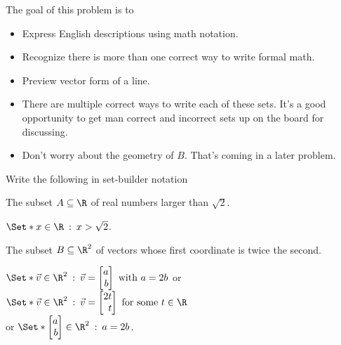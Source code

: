 \documentclass{problemset}
\newcommand{\bookonlynewpage}{\begin{bookonly}\newpage\end{bookonly}}
\begin{document}
	\question
	\begin{annotation}
		\begin{goals}

			The goal of this problem is to
			\begin{itemize}
				\item Express English descriptions using math notation.
				\item Recognize there is more than one correct way to
					write formal math.
				\item Preview vector form of a line.
			\end{itemize}
		\end{goals}

		\begin{notes}
			\begin{itemize}
				\item There are multiple correct ways to write
					each of these sets. It's a good opportunity
					to get man correct and incorrect sets up on the
					board for discussing.
				\item Don't worry about the geometry of $B$. That's coming
					in a later problem.
			\end{itemize}
		\end{notes}
	\end{annotation}
		Write the following in set-builder notation
	\begin{parts}
			\item The subset $A\subseteq \R$ of real numbers larger than $\sqrt{2}$.
				\begin{solution}
					$\Set*{x\in\R \given x>\sqrt{2}}$.
				\end{solution}
			\item The subset $B\subseteq \R^2$ of vectors whose first coordinate
			is twice the second.
				\begin{solution}
					$\Set*{\vec v\in\R^2\given \vec v=\mat{a\\b}\text{ with }a=2b}$
					or
					$\Set*{\vec v\in\R^2\given\vec v=\mat{2t\\t}\text{ for some }t\in \R}$\\
					or
					$\Set*{\mat{a\\b}\in\R^2\given a=2b}$.
				\end{solution}
	\end{parts}


	\bookonlynewpage
\end{document}
